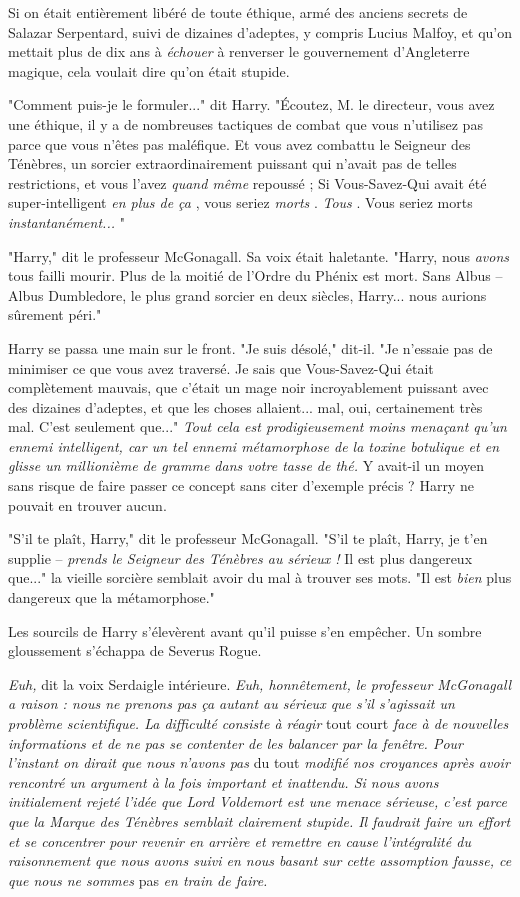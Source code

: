 Si on était entièrement libéré de toute éthique, armé des anciens secrets de Salazar Serpentard, suivi de dizaines d'adeptes, y compris Lucius Malfoy, et qu'on mettait plus de dix ans à \emph{échouer}  à renverser le gouvernement d'Angleterre magique, cela voulait dire qu'on était stupide.

"Comment puis-je le formuler..." dit Harry. "Écoutez, M. le directeur, vous avez une éthique, il y a de nombreuses tactiques de combat que vous n'utilisez pas parce que vous n'êtes pas maléfique. Et vous avez combattu le Seigneur des Ténèbres, un sorcier extraordinairement puissant qui n'avait pas de telles restrictions, et vous l'avez \emph{quand même}  repoussé ; Si Vous-Savez-Qui avait été super-intelligent \emph{en plus de ça} , vous seriez \emph{morts} . \emph{Tous} . Vous seriez morts \emph{instantanément...} "

"Harry," dit le professeur McGonagall. Sa voix était haletante. "Harry, nous \emph{avons}  tous failli mourir. Plus de la moitié de l'Ordre du Phénix est mort. Sans Albus – Albus Dumbledore, le plus grand sorcier en deux siècles, Harry... nous aurions sûrement péri."

Harry se passa une main sur le front. "Je suis désolé," dit-il. "Je n'essaie pas de minimiser ce que vous avez traversé. Je sais que Vous-Savez-Qui était complètement mauvais, que c'était un mage noir incroyablement puissant avec des dizaines d'adeptes, et que les choses allaient... mal, oui, certainement très mal. C'est seulement que..." \emph{Tout cela est prodigieusement moins menaçant qu'un ennemi intelligent, car un tel ennemi métamorphose de la toxine botulique et en glisse un millionième de gramme dans votre tasse de thé.}  Y avait-il un moyen sans risque de faire passer ce concept sans citer d'exemple précis ? Harry ne pouvait en trouver aucun.

"S'il te plaît, Harry," dit le professeur McGonagall. "S'il te plaît, Harry, je t'en supplie – \emph{prends le Seigneur des Ténèbres au sérieux !}  Il est plus dangereux que..." la vieille sorcière semblait avoir du mal à trouver ses mots. "Il est \emph{bien}  plus dangereux que la métamorphose."

Les sourcils de Harry s'élevèrent avant qu'il puisse s'en empêcher. Un sombre gloussement s'échappa de Severus Rogue.

\emph{Euh, } dit la voix Serdaigle intérieure. \emph{Euh, honnêtement, le professeur McGonagall a raison : nous ne prenons pas ça autant au sérieux que s'il s'agissait un problème scientifique. La difficulté consiste à réagir } tout court \emph{face à de nouvelles informations et de ne pas se contenter de les balancer par la fenêtre. Pour l'instant on dirait que nous n'avons pas } du tout \emph{modifié nos croyances après avoir rencontré un argument à la fois important et inattendu. Si nous avons initialement rejeté l'idée que Lord Voldemort est une menace sérieuse, c'est parce que la Marque des Ténèbres semblait clairement stupide. Il faudrait faire un effort et se concentrer pour revenir en arrière et remettre en cause l'intégralité du raisonnement que nous avons suivi en nous basant sur cette assomption fausse, ce que nous ne sommes } pas \emph{en train de faire.} 

